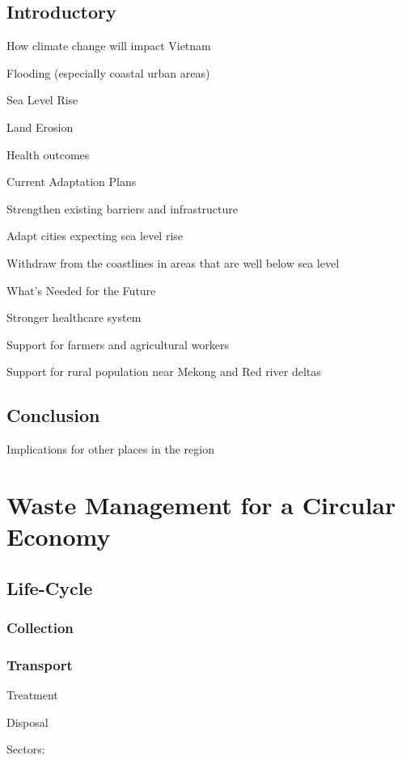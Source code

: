 \documentclass{book}\usepackage{knitr}
\begin{document}
\begin{knitrout}
\begin{kframe}
\section{Introductory}

How climate change will impact Vietnam

Flooding (especially coastal urban areas)

Sea Level Rise

Land Erosion

Health outcomes

Current Adaptation Plans

Strengthen existing barriers and infrastructure

Adapt cities expecting sea level rise

Withdraw from the coastlines in areas that are well below sea level

What's Needed for the Future

Stronger healthcare system

Support for farmers and agricultural workers

Support for rural population near Mekong and Red river deltas

\section{Conclusion}

Implications for other places in the region


\chapter{Waste Management for a Circular Economy}

\section{Life-Cycle}

\subsection{Collection}

\subsection{Transport}

Treatment

Disposal

Sectors:


\end{kframe}
\end{knitrout}
\end{document}
